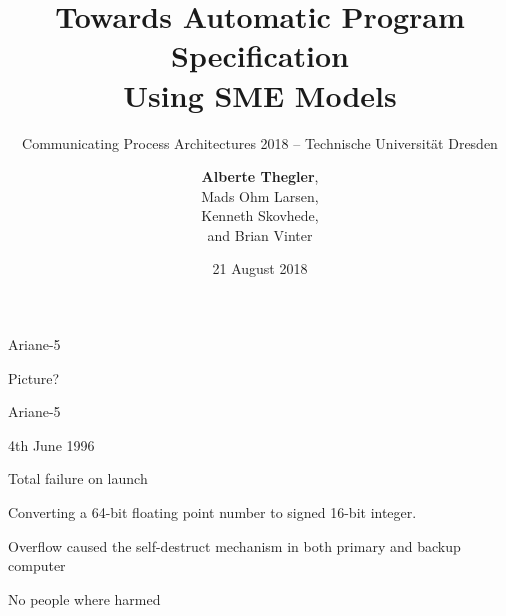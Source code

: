 \documentclass[13pt]{beamer}
\title[Towards Automatic Program Specification Using SME Models]{Towards Automatic Program Specification \\ Using SME Models}
\subtitle{\tiny Communicating Process Architectures 2018 -- Technische Universität Dresden}
\author[A. Thegler]
{\textbf{Alberte Thegler},\\
Mads Ohm Larsen,\\
Kenneth Skovhede,\\
and Brian Vinter\\
}
\institute[Niels Bohr Institute]{Niels Bohr Institute, University of Copenhagen, Denmark}
\date[August 21]{21 August 2018}
\newcommand{\cspm}{CSP$_M$}
\begin{document}
\frame[plain]{\titlepage}


\begin{frame}{Ariane-5}
  \begin{block}{}
    Picture?
  \end{block}

\end{frame}

\begin{frame}{Ariane-5}
  \begin{block}{}
    4th June 1996
  \end{block}

  \pause

  \begin{block}{}
     Total failure on launch
  \end{block}

  \pause

  \begin{block}{}
     Converting a 64-bit floating point number to signed 16-bit integer.
  \end{block}

  \pause

  \begin{block}{}
    Overflow caused the self-destruct mechanism in both primary and backup computer
  \end{block}

  \pause

  \begin{block}{}
     No people where harmed
  \end{block}

\end{frame}
\end{document}

